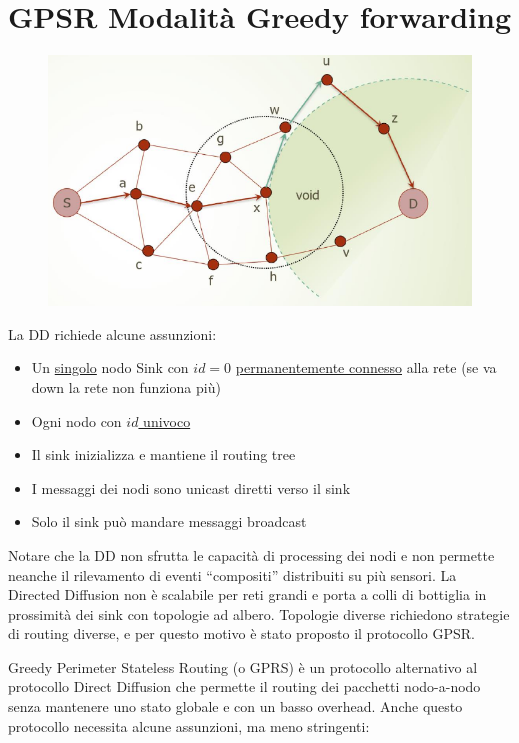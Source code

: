\section{GPSR Modalità Greedy forwarding}

\begin{figure}[htbp]
   \centering
   \includegraphics{images/questions/Schermata del 2023-10-20 12-13-24.png}
   \label{fig:dom30}
\end{figure}

La DD richiede alcune assunzioni:
\begin{itemize}
   \item Un \ul{singolo} nodo Sink con $id = 0$ \ul{permanentemente connesso} alla rete (se va down la rete non funziona più)
   \item Ogni nodo con \ul{$id$ univoco}
   \item Il sink inizializza e mantiene il routing tree
   \item I messaggi dei nodi sono unicast diretti verso il sink
   \item Solo il sink può mandare messaggi broadcast
\end{itemize}
Notare che la DD non sfrutta le capacità di processing dei nodi e non permette neanche il rilevamento di eventi ``compositi'' distribuiti su più sensori.
La Directed Diffusion non è scalabile per reti grandi e porta a colli di bottiglia in prossimità dei sink con topologie ad albero. Topologie diverse richiedono strategie di routing diverse, e per questo motivo è stato proposto il protocollo GPSR.

Greedy Perimeter Stateless Routing (o GPRS) è un protocollo alternativo al protocollo Direct Diffusion che permette il routing dei pacchetti nodo-a-nodo senza mantenere uno stato globale e con un basso overhead. 
Anche questo protocollo necessita alcune assunzioni, ma meno stringenti:

